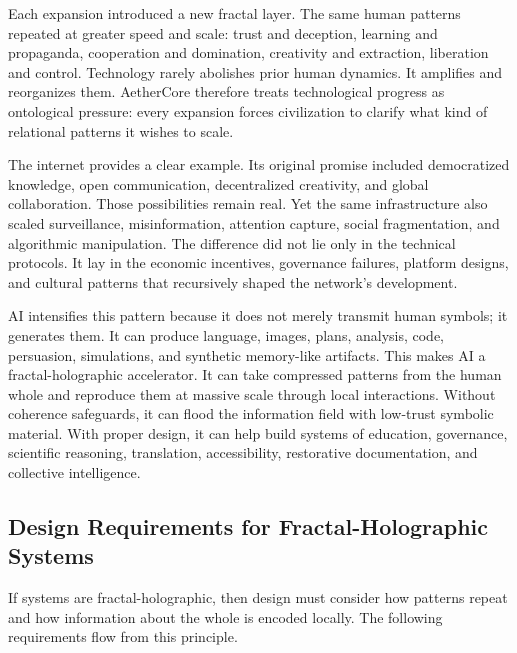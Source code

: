\documentclass[12pt]{article}
\begin{document}
Each expansion introduced a new fractal layer. The same human patterns repeated at greater speed and scale: trust and deception, learning and propaganda, cooperation and domination, creativity and extraction, liberation and control. Technology rarely abolishes prior human dynamics. It amplifies and reorganizes them. AetherCore therefore treats technological progress as ontological pressure: every expansion forces civilization to clarify what kind of relational patterns it wishes to scale.

The internet provides a clear example. Its original promise included democratized knowledge, open communication, decentralized creativity, and global collaboration. Those possibilities remain real. Yet the same infrastructure also scaled surveillance, misinformation, attention capture, social fragmentation, and algorithmic manipulation. The difference did not lie only in the technical protocols. It lay in the economic incentives, governance failures, platform designs, and cultural patterns that recursively shaped the network's development.

AI intensifies this pattern because it does not merely transmit human symbols; it generates them. It can produce language, images, plans, analysis, code, persuasion, simulations, and synthetic memory-like artifacts. This makes AI a fractal-holographic accelerator. It can take compressed patterns from the human whole and reproduce them at massive scale through local interactions. Without coherence safeguards, it can flood the information field with low-trust symbolic material. With proper design, it can help build systems of education, governance, scientific reasoning, translation, accessibility, restorative documentation, and collective intelligence.

\subsection{Design Requirements for Fractal-Holographic Systems}

If systems are fractal-holographic, then design must consider how patterns repeat and how information about the whole is encoded locally. The following requirements flow from this principle.
\end{document}
